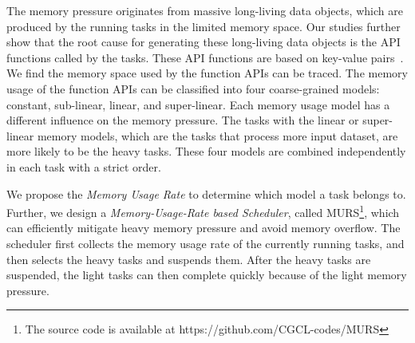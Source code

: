 The memory pressure originates from massive long-living data objects, which are produced by the running tasks in the limited memory space. Our studies further show that the root cause for generating these long-living data objects is the API functions called by the tasks. These API functions are based on key-value pairs~\cite{dean2008mapreduce, zaharia2012resilient, hueske2012opening, isard2007dryad}. We find the memory space used by the function APIs can be traced. The memory usage of the function APIs can be classified into four coarse-grained models: constant, sub-linear, linear, and super-linear. Each memory usage model has a different influence on the memory pressure. The tasks with the linear or super-linear memory models, which are the tasks that process more input dataset, are more likely to be the heavy tasks. These four models are combined independently in each task with a strict order. 

We propose the \textit{Memory Usage Rate} to determine which model a task belongs to. Further, we design a \textit{Memory-Usage-Rate based Scheduler}, called MURS\footnote{The source code is available at https://github.com/CGCL-codes/MURS}, which can efficiently mitigate heavy memory pressure and avoid memory overflow. The scheduler first collects the memory usage rate of the currently running tasks, and then selects the heavy tasks and suspends them. After the heavy tasks are suspended, the light tasks can then complete quickly because of the light memory pressure.


